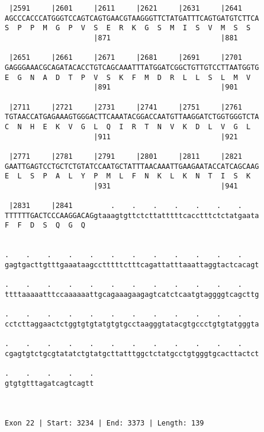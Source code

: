 \documentclass{article}
\begin{document}
\begin{Verbatim}
 |2591     |2601     |2611     |2621     |2631     |2641    
AGCCCACCCATGGGTCCAGTCAGTGAACGTAAGGGTTCTATGATTTCAGTGATGTCTTCA
S  P  P  M  G  P  V  S  E  R  K  G  S  M  I  S  V  M  S  S  
                     |871                          |881     
  
 |2651     |2661     |2671     |2681     |2691     |2701    
GAGGGAAACGCAGATACACCTGTCAGCAAATTTATGGATCGGCTGTTGTCCTTAATGGTG
E  G  N  A  D  T  P  V  S  K  F  M  D  R  L  L  S  L  M  V  
                     |891                          |901     
  
 |2711     |2721     |2731     |2741     |2751     |2761    
TGTAACCATGAGAAAGTGGGACTTCAAATACGGACCAATGTTAAGGATCTGGTGGGTCTA
C  N  H  E  K  V  G  L  Q  I  R  T  N  V  K  D  L  V  G  L  
                     |911                          |921     
  
 |2771     |2781     |2791     |2801     |2811     |2821    
GAATTGAGTCCTGCTCTGTATCCAATGCTATTTAACAAATTGAAGAATACCATCAGCAAG
E  L  S  P  A  L  Y  P  M  L  F  N  K  L  K  N  T  I  S  K  
                     |931                          |941     
  
 |2831     |2841         .    .    .    .    .    .    .    
TTTTTTGACTCCCAAGGACAGgtaaagtgttctcttatttttcacctttctctatgaata
F  F  D  S  Q  G  Q                                         
                                                            
  
.    .    .    .    .    .    .    .    .    .    .    .    
gagtgacttgtttgaaataagcctttttctttcagattatttaaattaggtactcacagt
                                                            
.    .    .    .    .    .    .    .    .    .    .    .    
ttttaaaaatttccaaaaaattgcagaaagaagagtcatctcaatgtaggggtcagcttg
                                                            
.    .    .    .    .    .    .    .    .    .    .    .    
cctcttaggaactctggtgtgtatgtgtgcctaagggtatacgtgccctgtgtatgggta
                                                            
.    .    .    .    .    .    .    .    .    .    .    .    
cgagtgtctgcgtatatctgtatgcttatttggctctatgcctgtgggtgcacttactct
                                                            
.    .    .    .    .
gtgtgtttagatcagtcagtt
                     
                     
 
Exon 22 | Start: 3234 | End: 3373 | Length: 139




\end{Verbatim}
\end{document}
